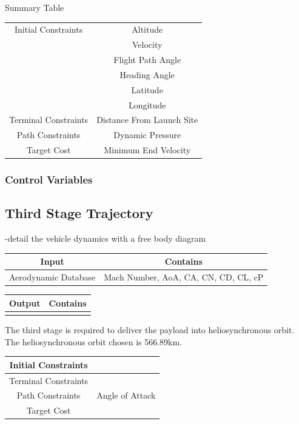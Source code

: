 Summary Table

\begin{tabular}{|c|c|}
	\hline Initial Constraints  & Altitude \\ & Velocity\\ & Flight Path Angle\\ & Heading Angle\\ & Latitude\\ & Longitude\\ 
	\hline Terminal Constraints &  Distance From Launch Site \\ 
	\hline Path Constraints & Dynamic Pressure \\ 
	\hline Target Cost & Minimum End Velocity \\ 
	\hline 
\end{tabular} 

\subsubsection{Control Variables}


\subsection{Third Stage Trajectory}

-detail the vehicle dynamics with a free body diagram 

\begin{tabular}{|c|c|}
	\hline Input  & Contains\\ 
	\hline Aerodynamic Database  & Mach Number, AoA, CA, CN, CD, CL, cP\\ 
	\hline 
\end{tabular} 

\begin{tabular}{|c|c|}
	\hline Output  & Contains\\ 
	\hline   & \\ 
	\hline 
\end{tabular} 

The third stage is required to deliver the payload into heliosynchronous orbit. The heliosynchronous orbit chosen is 566.89km. 

\begin{tabular}{|c|c|}
	\hline Initial Constraints  & \\ 
	\hline Terminal Constraints &  \\ 
	\hline Path Constraints & Angle of Attack \\ 
	\hline Target Cost &  \\ 
	\hline 
\end{tabular} 


